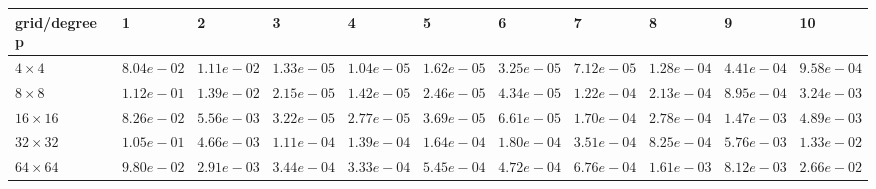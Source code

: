 \begin{tabular}{lllllllllll}
\hline
 grid/degree p   & 1          & 2          & 3          & 4          & 5          & 6          & 7          & 8          & 9          & 10         \\
\hline
 $4 \times 4$    & $8.04e-02$ & $1.11e-02$ & $1.33e-05$ & $1.04e-05$ & $1.62e-05$ & $3.25e-05$ & $7.12e-05$ & $1.28e-04$ & $4.41e-04$ & $9.58e-04$ \\
 $8 \times 8$    & $1.12e-01$ & $1.39e-02$ & $2.15e-05$ & $1.42e-05$ & $2.46e-05$ & $4.34e-05$ & $1.22e-04$ & $2.13e-04$ & $8.95e-04$ & $3.24e-03$ \\
 $16 \times 16$  & $8.26e-02$ & $5.56e-03$ & $3.22e-05$ & $2.77e-05$ & $3.69e-05$ & $6.61e-05$ & $1.70e-04$ & $2.78e-04$ & $1.47e-03$ & $4.89e-03$ \\
 $32 \times 32$  & $1.05e-01$ & $4.66e-03$ & $1.11e-04$ & $1.39e-04$ & $1.64e-04$ & $1.80e-04$ & $3.51e-04$ & $8.25e-04$ & $5.76e-03$ & $1.33e-02$ \\
 $64 \times 64$  & $9.80e-02$ & $2.91e-03$ & $3.44e-04$ & $3.33e-04$ & $5.45e-04$ & $4.72e-04$ & $6.76e-04$ & $1.61e-03$ & $8.12e-03$ & $2.66e-02$ \\
\hline
\end{tabular}